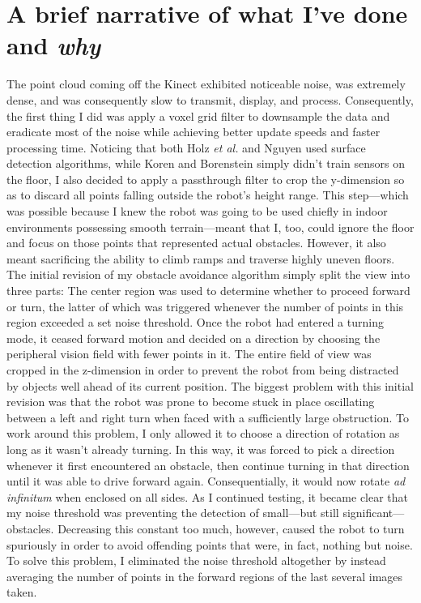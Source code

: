 \documentclass{article}
\begin{document}
\section{A brief narrative of what I've done and \textit{why}}
The point cloud coming off the Kinect exhibited noticeable noise, was extremely dense, and was consequently slow to transmit, display, and process.  Consequently, the first thing I did was apply a voxel grid filter to downsample the data and eradicate most of the noise while achieving better update speeds and faster processing time.  Noticing that both Holz \textit{et al.} and Nguyen used surface detection algorithms, while Koren and Borenstein simply didn't train sensors on the floor, I also decided to apply a passthrough filter to crop the y-dimension so as to discard all points falling outside the robot's height range.  This step---which was possible because I knew the robot was going to be used chiefly in indoor environments possessing smooth terrain---meant that I, too, could ignore the floor and focus on those points that represented actual obstacles.  However, it also meant sacrificing the ability to climb ramps and traverse highly uneven floors.
The initial revision of my obstacle avoidance algorithm simply split the view into three parts:  The center region was used to determine whether to proceed forward or turn, the latter of which was triggered whenever the number of points in this region exceeded a set noise threshold.  Once the robot had entered a turning mode, it ceased forward motion and decided on a direction by choosing the peripheral vision field with fewer points in it.  The entire field of view was cropped in the z-dimension in order to prevent the robot from being distracted by objects well ahead of its current position.  The biggest problem with this initial revision was that the robot was prone to become stuck in place oscillating between a left and right turn when faced with a sufficiently large obstruction.  To work around this problem, I only allowed it to choose a direction of rotation as long as it wasn't already turning.  In this way, it was forced to pick a direction whenever it first encountered an obstacle, then continue turning in that direction until it was able to drive forward again.  Consequentially, it would now rotate \textit{ad infinitum} when enclosed on all sides.
As I continued testing, it became clear that my noise threshold was preventing the detection of small---but still significant---obstacles.  Decreasing this constant too much, however, caused the robot to turn spuriously in order to avoid offending points that were, in fact, nothing but noise.  To solve this problem, I eliminated the noise threshold altogether by instead averaging the number of points in the forward regions of the last several images taken.
\end{document}
